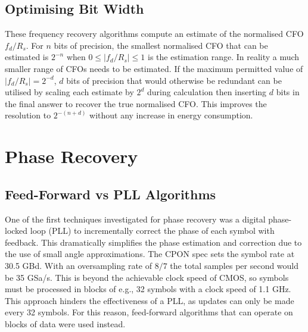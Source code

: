 \documentclass[12pt,a4paper]{article}
\begin{document}
\subsection{Optimising Bit Width}
These frequency recovery algorithms compute an estimate of the normalised CFO \(f_d / R_s\). For \(n\) bits of precision, the smallest normalised CFO that can be estimated is \(2^{-n}\) when \(0 \leq |f_d / R_s| \leq 1\) is the estimation range. In reality a much smaller range of CFOs needs to be estimated. If the maximum permitted value of \(|f_d / R_s| = 2^{-d}\), \(d\) bits of precision that would otherwise be redundant can be utilised by scaling each estimate by \(2^d\) during calculation then inserting \(d\) bits in the final answer to recover the true normalised CFO. This improves the resolution to \(2^{-(n+d)}\)  without any increase in energy consumption.

\section{Phase Recovery}
\subsection{Feed-Forward vs PLL Algorithms}
One of the first techniques investigated for phase recovery was a digital phase-locked loop (PLL) to incrementally correct the phase of each symbol with feedback. This dramatically simplifies the phase estimation and correction due to the use of small angle approximations. The CPON spec sets the symbol rate at 30.5 GBd. With an oversampling rate of \(8/7\) the total samples per second would be 35 GSa/s. This is beyond the achievable clock speed of CMOS, so symbols must be processed in blocks of e.g., 32 symbols with a clock speed of 1.1 GHz. This approach hinders the effectiveness of a PLL, as updates can only be made every 32 symbols. For this reason, feed-forward algorithms that can operate on blocks of data were used instead.
\end{document}
